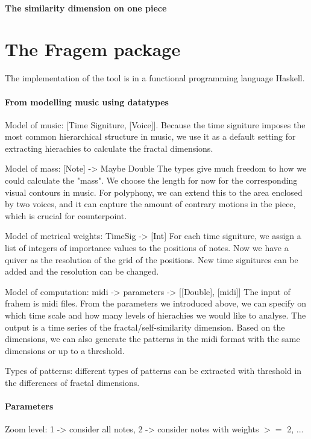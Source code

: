 \documentclass[acmsmall,10pt]{acmart}%
\begin{document}
\paragraph{The similarity dimension on one piece}

\section{The Fragem package}
The implementation of the tool is in a functional programming language Haskell.

\paragraph{From modelling music using datatypes}

Model of music: [Time Signiture, [Voice]]. Because the time signiture imposes
the most common hierarchical structure in music, we use it as a default setting
for extracting hierachies to calculate the fractal dimensions. 

Model of mass: [Note] -> Maybe Double
The types give much freedom to how we could calculate the "mass". We choose the length for now for the corresponding visual contours in music. For polyphony, we can extend this to the area enclosed by two voices, and it can capture the amount of contrary motions in the piece, which is crucial for counterpoint.

Model of metrical weights: TimeSig -> [Int]
For each time signiture, we assign a list of integers of importance values to the positions of notes. Now we have a quiver as the resolution of the grid of the positions. New time signitures can be added and the resolution can be changed.

Model of computation: midi -> parameters -> [[Double], [midi]]
The input of frahem is midi files. From the parameters we introduced above, we can specify on which time scale and how many levels of hierachies we would like to analyse. The output is a time series of the fractal/self-similarity dimension. Based on the dimensions, we can also generate the patterns in the midi format with the same dimensions or up to a threshold.

Types of patterns: different types of patterns can be extracted with threshold
in the differences of fractal dimensions. 

\paragraph{Parameters}
Zoom level: 1 -> consider all notes, 2 -> consider notes with weights $>=$ 2,
...
\end{document}
